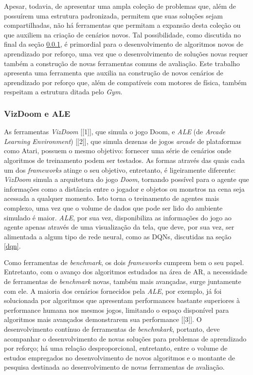 \documentclass[cic,tc]{iiufrgs}
\begin{document}
Apesar, todavia, de apresentar uma ampla coleção de problemas que, além de
possuírem uma estrutura padronizada, permitem que suas soluções sejam
compartilhadas, não há ferramentas que permitam a expansão desta coleção ou que
auxiliem na criação de cenários novos. Tal possibilidade, como discutida no
final da seção \ref{vizdoom_ale}, é primordial para o desenvolvimento de
algoritmos novos de aprendizado por reforço, uma vez que o desenvolvimento de
soluções novas requer também a construção de novas ferramentas comuns de
avaliação. Este trabalho apresenta uma ferramenta que auxilia na construção de
novos cenários de aprendizado por reforço que, além de compatíveis com motores
de física, também respeitam a estrutura ditada pelo \textit{Gym}.


\subsubsection{VizDoom e ALE}
\label{vizdoom_ale}
As ferramentas \textit{VizDoom} [[1]], que simula o jogo Doom, e \textit{ALE}
(de \textit{Arcade Learning Environment}) [[2]], que simula dezenas de jogos
\textit{arcade} de plataformas como Atari, possuem o mesmo objetivo: fornecer
uma série de cenários onde algoritmos de treinamento podem ser testados. As
formas através das quais cada um dos \textit{frameworks} atinge o seu objetivo,
entretanto, é ligeiramente diferente: \textit{VizDoom} simula a arquitetura do
jogo \textit{Doom}, tornando possível para o agente que informações como a
distância entre o jogador e objetos ou monstros na cena seja acessada a qualquer
momento. Isto torna o treinamento de agentes mais complexo, uma vez que o
volume de dados que pode ser lido do ambiente simulado é maior. \textit{ALE},
por sua vez, disponibiliza as informações do jogo ao agente apenas através de
uma visualização da tela, que deve, por sua vez, ser alimentada a algum tipo
de rede neural, como as DQNs, discutidas na seção \ref{dqn}.


Como ferramentas de \textit{benchmark}, os dois \textit{frameworks} cumprem bem
o seu papel. Entretanto, com o avanço dos algoritmos estudados na área de AR,
a necessidade de ferramentas de \textit{benchmark} novas, também mais avançadas,
surge juntamente com ele. A maioria dos cenários fornecidos pela \textit{ALE},
por exemplo, já foi solucionada por algoritmos que apresentam performances
bastante superiores à performance humana nos mesmos jogos, limitando o espaço
disponível para algoritmos mais avançados demonstrarem sua performance [[3]]. O
desenvolvimento contínuo de ferramentas de \textit{benchmkark}, portanto, deve
acompanhar o desenvolvimento de novas soluções para problemas de aprendizado por
reforço; há uma relação desproporcional, entretanto, entre o volume de estudos
empregados no desenvolvimento de novos algoritmos e o montante de pesquisa
destinada ao desenvolvimento de novas ferramentas de avaliação.
\end{document}
